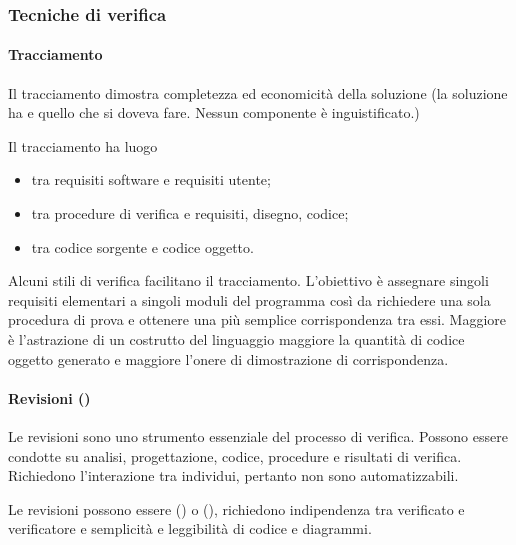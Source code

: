 
\subsubsection{Tecniche di verifica}
\label{ssub:tecniche_di_verifica}

\paragraph{Tracciamento}
\label{par:tracciamento}


Il tracciamento dimostra completezza ed economicità della soluzione (la
soluzione ha  e  quello che si doveva fare. Nessun
componente è inguistificato.)

Il tracciamento ha luogo

\begin{itemize}
  \item tra requisiti software e requisiti utente;
  \item tra procedure di verifica e requisiti, disegno, codice;
  \item tra codice sorgente e codice oggetto.
\end{itemize}

Alcuni stili di verifica facilitano il tracciamento. L'obiettivo è assegnare
singoli requisiti elementari a singoli moduli del programma così da
richiedere una sola procedura di prova e ottenere una più semplice
corrispondenza tra essi. Maggiore è l'astrazione di un costrutto del linguaggio
maggiore la quantità di codice oggetto generato e maggiore l'onere di
dimostrazione di corrispondenza.

\paragraph{Revisioni ()}
\label{par:joint_review_audit}

Le revisioni sono uno strumento essenziale del processo di verifica. Possono
essere condotte su analisi, progettazione, codice, procedure e risultati di
verifica. Richiedono l'interazione tra individui, pertanto non sono
automatizzabili.

Le revisioni possono essere  () o
 (), richiedono indipendenza tra
verificato e verificatore e semplicità e leggibilità di codice e diagrammi.

